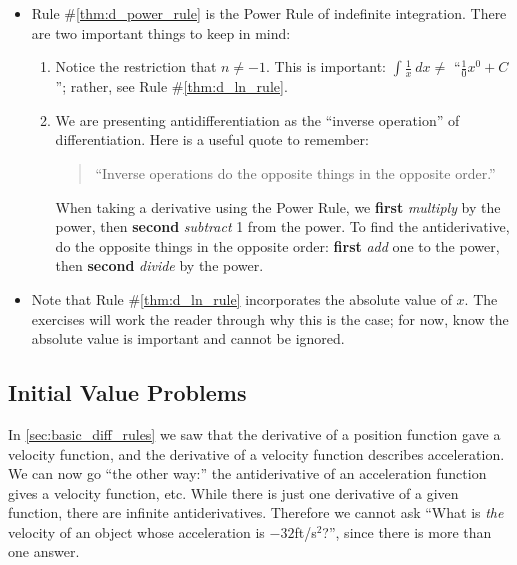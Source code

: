\begin{itemize}
	\item	Rule \#\ref{thm:d_power_rule} is the Power Rule of indefinite integration. There are two important things to keep in mind:
	\begin{enumerate}
		\item	Notice the restriction that $n\neq -1$. This is important: $\int \frac{1}{x}\ dx \neq $ ``$\frac{1}{0}x^0+C$\primeskip''; rather, see Rule \#\ref{thm:d_ln_rule}.
		\item	We are presenting antidifferentiation as the ``inverse operation'' of differentiation. Here is a useful quote to remember:
		\begin{quote}
			``Inverse operations do the opposite things in the opposite order.''
		\end{quote}
		When taking a derivative using the Power Rule, we \textbf{first} \textit{multiply} by the power, then \textbf{second} \textit{subtract} 1 from the power. To find the antiderivative, do the opposite things in the opposite order: \textbf{first} \textit{add} one to the power, then \textbf{second} \textit{divide} by the power.
	\end{enumerate}
	\item	Note that Rule \#\ref{thm:d_ln_rule} incorporates the absolute value of $x$. The exercises will work the reader through why this is the case; for now, know the absolute value is important and cannot be ignored.
\end{itemize}

\subsection*{Initial Value Problems}

In \autoref{sec:basic_diff_rules} we saw that the derivative of a position function gave a velocity function, and the derivative of a velocity function describes  acceleration. We can now go ``the other way:'' the antiderivative of an acceleration function gives a velocity function, etc. While there is just one derivative of a given function, there are infinite antiderivatives. Therefore we cannot ask ``What is \textit{the} velocity of an object whose acceleration is $-32$ft/s$^2$?'', since there is more than one answer.


